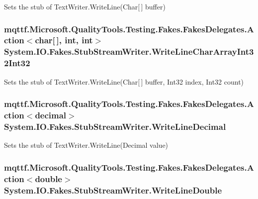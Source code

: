 Sets the stub of Text\-Writer.\-Write\-Line(\-Char\mbox{[}$\,$\mbox{]} buffer)

\hypertarget{class_system_1_1_i_o_1_1_fakes_1_1_stub_stream_writer_a361c780e56d1e2403dca50659bc1a73c}{
\subsubsection[{Write\-Line\-Char\-Array\-Int32\-Int32}]{\setlength{\rightskip}{0pt plus 5cm}mqttf.\-Microsoft.\-Quality\-Tools.\-Testing.\-Fakes.\-Fakes\-Delegates.\-Action$<$char\mbox{[}$\,$\mbox{]}, int, int$>$ System.\-I\-O.\-Fakes.\-Stub\-Stream\-Writer.\-Write\-Line\-Char\-Array\-Int32\-Int32}}\label{class_system_1_1_i_o_1_1_fakes_1_1_stub_stream_writer_a361c780e56d1e2403dca50659bc1a73c}


Sets the stub of Text\-Writer.\-Write\-Line(\-Char\mbox{[}$\,$\mbox{]} buffer, Int32 index, Int32 count)

\hypertarget{class_system_1_1_i_o_1_1_fakes_1_1_stub_stream_writer_a85b9d0752dd714e7106af463315a82a9}{
\subsubsection[{Write\-Line\-Decimal}]{\setlength{\rightskip}{0pt plus 5cm}mqttf.\-Microsoft.\-Quality\-Tools.\-Testing.\-Fakes.\-Fakes\-Delegates.\-Action$<$decimal$>$ System.\-I\-O.\-Fakes.\-Stub\-Stream\-Writer.\-Write\-Line\-Decimal}}\label{class_system_1_1_i_o_1_1_fakes_1_1_stub_stream_writer_a85b9d0752dd714e7106af463315a82a9}


Sets the stub of Text\-Writer.\-Write\-Line(\-Decimal value)

\hypertarget{class_system_1_1_i_o_1_1_fakes_1_1_stub_stream_writer_a74ceb1e259ac7bba566ccb2b0788d6af}{
\subsubsection[{Write\-Line\-Double}]{\setlength{\rightskip}{0pt plus 5cm}mqttf.\-Microsoft.\-Quality\-Tools.\-Testing.\-Fakes.\-Fakes\-Delegates.\-Action$<$double$>$ System.\-I\-O.\-Fakes.\-Stub\-Stream\-Writer.\-Write\-Line\-Double}}\label{class_system_1_1_i_o_1_1_fakes_1_1_stub_stream_writer_a74ceb1e259ac7bba566ccb2b0788d6af}



